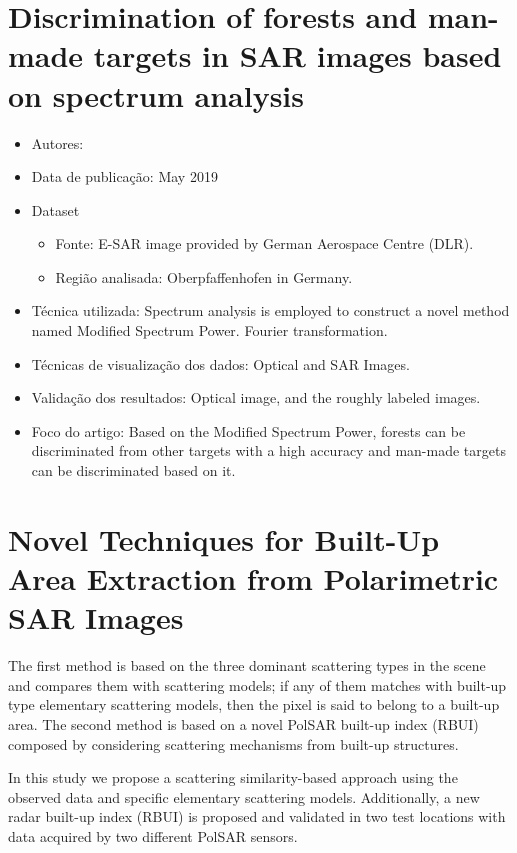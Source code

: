\documentclass[paper=a4, fontsize=11pt]{scrartcl}
\begin{document}
\newpage

\section*{Discrimination of forests and man-made targets in SAR images based on spectrum analysis}

\begin{itemize}
    \item Autores:~\cite{zou2019discrimination}
    \item Data de publicação: May 2019
    \item Dataset
    \begin{itemize}
        \item Fonte: E-SAR image provided by German Aerospace Centre (DLR).
        \item Região analisada: Oberpfaffenhofen in Germany.
    \end{itemize}
    \item Técnica utilizada: Spectrum analysis is employed to construct a novel method named Modified Spectrum Power. Fourier transformation.
    \item Técnicas de visualização dos dados: Optical and SAR Images.
    \item Validação dos resultados: Optical image, and the roughly labeled images.
    \item Foco do artigo: Based on the Modified Spectrum Power, forests can be discriminated from other targets with a high accuracy and man-made targets can be discriminated based on it.
\end{itemize}

\newpage

\section*{Novel Techniques for Built-Up Area Extraction from Polarimetric SAR Images}

The first method is based on the three dominant scattering types in the scene and compares them with scattering models; if any of them matches with built-up type elementary scattering models, then the pixel is said to belong to a built-up area. 
The second method is based on a novel PolSAR built-up index (RBUI) composed by considering scattering mechanisms from built-up structures.

In this study we propose a scattering similarity-based approach using the observed data and specific elementary scattering models. 
Additionally, a new radar built-up index (RBUI) is proposed and validated in two test locations with data acquired by two different PolSAR sensors.
\end{document}
